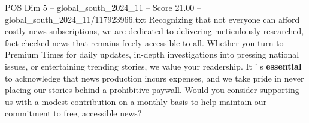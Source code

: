 \begin{textsample}{POS Dim 5 – global\_south\_2024\_11 – Score 21.00 – global\_south\_2024\_11/117923966.txt}
Recognizing that not everyone can afford costly news subscriptions, we are dedicated to delivering meticulously researched, fact-checked news that remains freely accessible to all.
Whether you turn to Premium Times for daily updates, in-depth investigations into pressing national issues, or entertaining trending stories, we value your readership.
It ' s \textbf{essential} to acknowledge that news production incurs expenses, and we take pride in never placing our stories behind a prohibitive paywall.
Would you consider supporting us with a modest contribution on a monthly basis to help maintain our commitment to free, accessible news?

\end{textsample}
